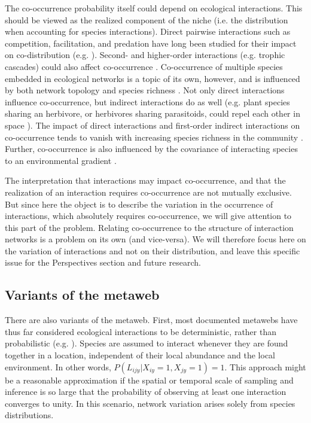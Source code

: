 \documentclass[12pt]{article}
\begin{document}
The co-occurrence probability itself could depend on ecological interactions.
This should be viewed as the realized component of the niche (i.e. the
distribution when accounting for species interactions). Direct pairwise
interactions such as competition, facilitation, and predation have long been
studied for their impact on co-distribution (e.g. \citealt{Diamond1975,
Connor1979, Gotelli2000}). Second- and higher-order interactions (e.g. trophic
cascades) could also affect co-occurrence \citep{Harris2016,
Staniczenko2017}. Co-occurrence of multiple species embedded in ecological
networks is a topic of its own, however, and is influenced by both network
topology and species richness \citep{Cazelles2016}. Not only direct
interactions influence co-occurrence, but indirect interactions do as well
(e.g. plant species sharing an herbivore, or herbivores sharing parasitoids,
could repel each other in space \citep{Holt1993}). The impact of direct
interactions and first-order indirect interactions on co-occurrence tends to
vanish with increasing species richness in the community \citep{Cazelles2016}.
Further, co-occurrence is also influenced by the covariance of interacting
species to an environmental gradient \citep{Cazelles2015}.

The interpretation that interactions may impact co-occurrence, and that the
realization of an interaction requires co-occurrence are not mutually
exclusive. But since here the object is to describe the variation in the
occurrence of interactions, which absolutely requires co-occurrence, we will
give attention to this part of the problem. Relating co-occurrence to the
structure of interaction networks is a problem on its own (and vice-versa). We
will therefore focus here on the variation of interactions and not on their
distribution, and leave this specific issue for the Perspectives section and
future research.

\subsection*{Variants of the metaweb}

There are also variants of the metaweb. First, most documented metawebs have
thus far considered ecological interactions to be deterministic, rather than
probabilistic (e.g. \citealt{Havens1992, Wood2015}). Species are assumed to
interact whenever they are found together in a location, independent of their
local abundance and the local environment. In other words,
$P(L_{ijy}\lvert X_{iy}=1,X_{jy}=1) = 1$. This approach might be a reasonable
approximation if the spatial or temporal scale of sampling and inference is so
large that the probability of observing at least one interaction converges to
unity. In this scenario, network variation arises solely from species
distributions.
\end{document}
